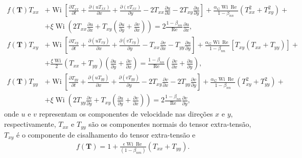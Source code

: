 \begin{subequations}
\begin{align}
    f(\mathbf{T}) T_{xx} & + \operatorname{Wi}\left[\frac{\partial T_{xx}}{\partial t} + \frac{\partial (uT_{xx})}{\partial x} + \frac{\partial (vT_{xx})}{\partial y} - 2T_{xx}\frac{\partial u}{\partial x} - 2T_{xy}\frac{\partial u}{\partial y}\right] + \frac{\alpha_{G}\operatorname{Wi}\operatorname{Re}}{1 - \beta_{nn}}\left(T_{xx}^{2} + T_{xy}^{2}\right) + \nonumber \\ & + \xi\operatorname{Wi}\left(2T_{xx}\frac{\partial u}{\partial x} + T_{xy}\left(\frac{\partial u}{\partial y} + \frac{\partial v}{\partial x}\right)\right) = 2 \frac{1 - \beta_{nn}}{\operatorname{Re}}\frac{\partial u}{\partial x}, \label{eq_lpog_txx}\\[7mm]
    f(\mathbf{T}) T_{xy} & + \operatorname{Wi}\left[\frac{\partial T_{xy}}{\partial t} + \frac{\partial (uT_{xy})} {\partial x} + \frac{\partial (vT_{xy})}{\partial y} - T_{xx}\frac{\partial v}{\partial x} - T_{yy}\frac{\partial u}{\partial y}\right] + \frac{\alpha_{G}\operatorname{Wi}\operatorname{Re}}{1 - \beta_{nn}}\left[T_{xy}\left(T_{xx} + T_{yy}\right)\right] + \nonumber \\ & + \frac{\xi\operatorname{Wi}}{2}\left(T_{xx} + T_{yy}\right)\left(\frac{\partial u}{\partial y} + \frac{\partial v}{\partial x}\right) = \frac{1 - \beta_{nn}}{\operatorname{Re}}\left(\frac{\partial v}{\partial x} + \frac{\partial u}{\partial y}\right), \label{eq_lpog_txy}\\[7mm]
    f(\mathbf{T})T_{yy} & + \operatorname{Wi}\left[\frac{\partial T_{yy}}{\partial t} + \frac{\partial (uT_{yy})}{\partial x} + \frac{\partial (vT_{yy})}{\partial y} - 2T_{xy}\frac{\partial v}{\partial x} - 2T_{yy}\frac{\partial v}{\partial y}\right] + \frac{\alpha_{G}\operatorname{Wi}\operatorname{Re}}{1 - \beta_{nn}}\left(T_{xy}^{2} + T_{yy}^{2}\right) + \nonumber \\ & + \xi\operatorname{Wi}\left(2T_{yy}\frac{\partial v}{\partial y} + T_{xy}\left(\frac{\partial u}{\partial y} + \frac{\partial v}{\partial x}\right)\right) = 2\frac{1 - \beta_{nn}}{\operatorname{Re}}\frac{\partial v}{\partial y},\label{eq_lpog_tyy}
\end{align}
\end{subequations}
onde $u$ e $v$ representam os componentes de velocidade nas direções $x$ e $y$, respectivamente, $T_{xx}$ e $T_{yy}$ são os componentes normais do tensor extra-tensão, $T_{xy}$ é o componente de cisalhamento do tensor extra-tensão e 
\begin{equation}
    \begin{split}
        f(\mathbf{T}) = 1+\frac{\epsilon \operatorname{Wi} \operatorname{Re}}{(1 - \beta_{nm})}\left(T_{xx} + T_{yy}\right).
    \end{split}\label{eq_funcao_traco_tensor_bidime}
\end{equation}

